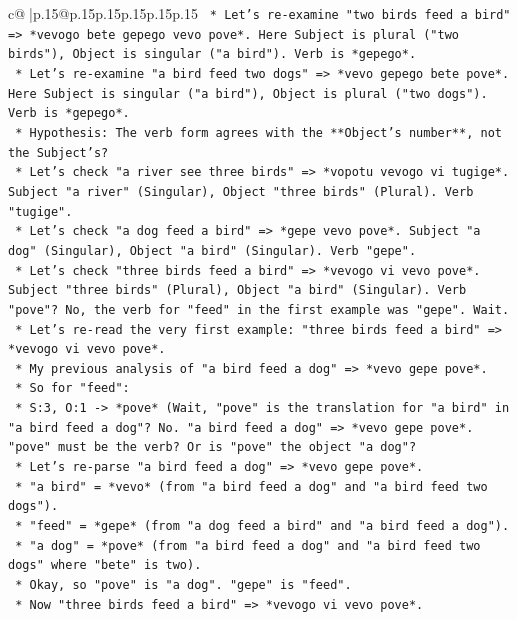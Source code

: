 \documentclass{article}
\begin{document}
{\begin{supertabular}{c@{$\;$}|p{.15\linewidth}@{}p{.15\linewidth}p{.15\linewidth}p{.15\linewidth}p{.15\linewidth}p{.15\linewidth}}
{{{\texttt{        *   Let's re{-}examine "two birds feed a bird" => *vevogo bete gepego vevo pove*. Here Subject is plural ("two birds"), Object is singular ("a bird"). Verb is *gepego*.} \\
\texttt{        *   Let's re{-}examine "a bird feed two dogs" => *vevo gepego bete pove*. Here Subject is singular ("a bird"), Object is plural ("two dogs"). Verb is *gepego*.} \\
\texttt{        *   Hypothesis: The verb form agrees with the **Object's number**, not the Subject's?} \\
\texttt{        *   Let's check "a river see three birds" => *vopotu vevogo vi tugige*. Subject "a river" (Singular), Object "three birds" (Plural). Verb "tugige".} \\
\texttt{        *   Let's check "a dog feed a bird" => *gepe vevo pove*. Subject "a dog" (Singular), Object "a bird" (Singular). Verb "gepe".} \\
\texttt{        *   Let's check "three birds feed a bird" => *vevogo vi vevo pove*. Subject "three birds" (Plural), Object "a bird" (Singular). Verb "pove"? No, the verb for "feed" in the first example was "gepe". Wait.} \\
\texttt{        *   Let's re{-}read the very first example: "three birds feed a bird" => *vevogo vi vevo pove*.} \\
\texttt{        *   My previous analysis of "a bird feed a dog" => *vevo gepe pove*.} \\
\texttt{        *   So for "feed":} \\
\texttt{            *   S:3, O:1 {-}> *pove* (Wait, "pove" is the translation for "a bird" in "a bird feed a dog"? No. "a bird feed a dog" => *vevo gepe pove*. "pove" must be the verb? Or is "pove" the object "a dog"?} \\
\texttt{            *   Let's re{-}parse "a bird feed a dog" => *vevo gepe pove*.} \\
\texttt{                *   "a bird" = *vevo* (from "a bird feed a dog" and "a bird feed two dogs").} \\
\texttt{                *   "feed" = *gepe* (from "a dog feed a bird" and "a bird feed a dog").} \\
\texttt{                *   "a dog" = *pove* (from "a bird feed a dog" and "a bird feed two dogs" where "bete" is two).} \\
\texttt{            *   Okay, so "pove" is "a dog". "gepe" is "feed".} \\
\texttt{            *   Now "three birds feed a bird" => *vevogo vi vevo pove*.} \\
}}}
\end{supertabular}}
\end{document}
